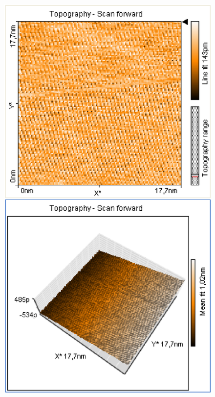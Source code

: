 \documentclass[12pt]{article}
\begin{document}
\begin{figure}[H]
\begin{minipage}{0.4\linewidth}
\includegraphics[width=0.9\linewidth]{../plot/data/graphit/graphit2.eps}
\end{minipage}
\end{figure}
\end{document}
